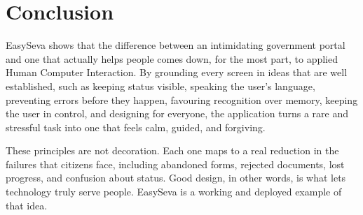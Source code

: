 \documentclass[12pt,a4paper]{article}
\begin{document}
\section{Conclusion}
EasySeva shows that the difference between an intimidating government portal and one
that actually helps people comes down, for the most part, to applied Human Computer
Interaction. By grounding every screen in ideas that are well established, such as
keeping status visible, speaking the user's language, preventing errors before they
happen, favouring recognition over memory, keeping the user in control, and
designing for everyone, the application turns a rare and stressful task into one
that feels calm, guided, and forgiving.

These principles are not decoration. Each one maps to a real reduction in the
failures that citizens face, including abandoned forms, rejected documents, lost
progress, and confusion about status. Good design, in other words, is what lets
technology truly serve people. EasySeva is a working and deployed example of that
idea.
\end{document}

